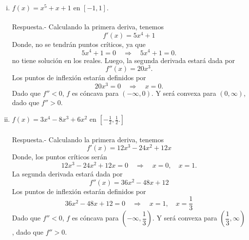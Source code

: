 \begin{enumerate}[\bfseries 1.]
\begin{enumerate}[(i)]
	    \item $f(x)=x^5+x+1$ en $[-1,1]$.\\\\
		Respuesta.-\; Calculando la primera deriva, tenemos
		$$f'(x)=5x^4+1$$
		Donde, no se tendrán puntos críticos, ya que
		$$5x^4+1=0\quad \Rightarrow \quad 5x^4+1=0.$$
		no tiene solución en los reales. Luego, la segunda derivada estará dada por
		$$f''(x)=20x^3.$$
		Los puntos de inflexión estarán definidos por
		$$20x^3=0\quad \Rightarrow \quad x=0.$$
		Dado que $f''<0$, $f$ es cóncava para $\left(-\infty,0\right)$. Y será convexa para $\left(0,\infty\right)$, dado que $f''>0$.\\
		\begin{center}
		\end{center}
		\vspace{.5cm}

	    \item $f(x)=3x^4-8x^3+6x^2$ en $\left[-\frac{1}{2},\frac{1}{2}.\right]$\\\\
		Respuesta.-\; Calculando la primera deriva, tenemos
		$$f'(x)=12x^3-24x^2+12x$$
		Donde, los puntos críticos serán
		$$12x^3-24x^2+12x=0\quad \Rightarrow \quad x=0,\quad x=1.$$
		La segunda derivada estará dada por
		$$f''(x)=36x^2-48x+12$$
		Los puntos de inflexión estarán definidos por
		$$36x^2-48x+12=0\quad \Rightarrow \quad x=1, \quad x=\dfrac{1}{3}$$
		Dado que $f''<0$, $f$ es cóncava para $\left(-\infty,\dfrac{1}{3}\right)$. Y será convexa para $\left(\dfrac{1}{3},\infty\right)$, dado que $f''>0$.\\
		\begin{center}
		\end{center}
		\vspace{.5cm}


\end{enumerate}
\end{enumerate}
